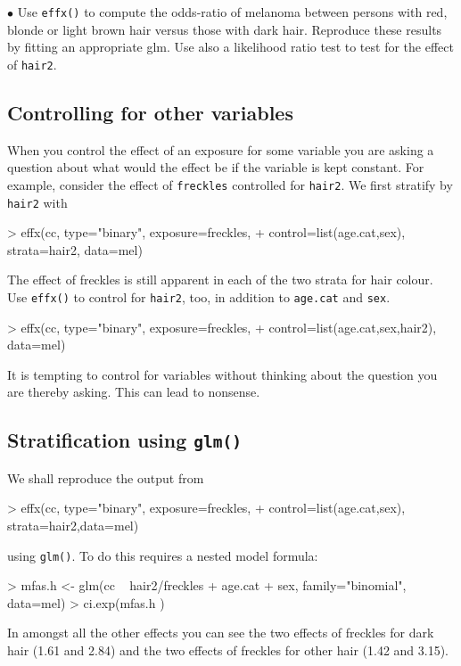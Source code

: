 \medskip
$\bullet$ Use \texttt{effx()} to compute the odds-ratio of melanoma
  between persons with red, blonde or light brown hair versus those with dark  hair.
Reproduce these results by fitting an appropriate glm.
Use also a likelihood ratio test to test for the effect of \texttt{hair2}.

\subsection{Controlling for other variables}

When you control the effect of an exposure for some variable you are asking a question about what would the effect be if the variable is kept constant. For example, consider the effect of {\tt freckles} controlled for {\tt hair2}. We first stratify by {\tt hair2} with
\begin{Schunk}
\begin{Sinput}
> effx(cc, type="binary", exposure=freckles, 
+                   control=list(age.cat,sex), strata=hair2, data=mel)
\end{Sinput}
\end{Schunk}
The effect of freckles is still apparent in each of the two strata for hair colour. Use {\tt effx()} to control for {\tt hair2}, too, in addition to \texttt{age.cat} and \texttt{sex}.
\begin{Schunk}
\begin{Sinput}
> effx(cc, type="binary", exposure=freckles, 
+                   control=list(age.cat,sex,hair2), data=mel)
\end{Sinput}
\end{Schunk}
It is tempting to control for variables without thinking about the question you are thereby asking. This can lead to nonsense.

\subsection{Stratification using \texttt{glm()} }
We shall reproduce the output from 
\begin{Schunk}
\begin{Sinput}
> effx(cc, type="binary", exposure=freckles, 
+            control=list(age.cat,sex), strata=hair2,data=mel)
\end{Sinput}
\end{Schunk}
using \texttt{glm()}. To do this requires a nested model formula:
\begin{Schunk}
\begin{Sinput}
> mfas.h <- glm(cc ~ hair2/freckles + age.cat + sex, family="binomial", data=mel)
> ci.exp(mfas.h )
\end{Sinput}
\end{Schunk}
In amongst all the other effects you can see the two effects of freckles for dark hair (1.61 and 2.84) and the two effects of freckles for other hair (1.42 and 3.15). 

